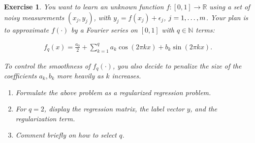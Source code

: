 \documentclass[12pt]{article}
\theoremstyle{colon}
\newtheorem{exercise}{Exercise}
\begin{document}
\clearpage

\begin{exercise}
  You want to learn an unknown function $f: [0,1] \rightarrow \mathbb{R}$ using a set of noisy measurements $(x_j, y_j)$, with $y_j = f(x_j) + \epsilon_j$, $j = 1, \mathellipsis, m$. Your plan is to approximate $f(\cdot)$ by a Fourier series on $[0,1]$ with $q \in \mathbb{N}$ terms:

  \begin{gather*}
    f_q(x) = \frac{a_0}{2} + \sum_{k=1}^q a_k \cos(2 \pi k x) + b_k \sin(2 \pi k x).
  \end{gather*}

  To control the smoothness of $f_q(\cdot)$, you also decide to penalize the size of the coefficients $a_k, b_k$ more heavily as $k$ increases.

  \begin{enumerate}[label=\alph*)]
    \item Formulate the above problem as a regularized regression problem.
    \item For $q=2$, display the regression matrix, the label vector $y$, and the regularization term.
    \item Comment briefly on how to select $q$.
  \end{enumerate}
\end{exercise}
\end{document}
